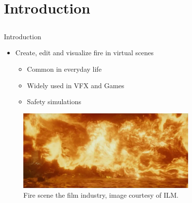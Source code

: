 \documentclass{beamer}
\begin{document}
\section{Introduction}
\subsection{ }

\begin{frame}{Introduction}

\begin{itemize}
\setlength\itemsep{0.5em}
\item Create, edit and visualize fire in virtual scenes
		\begin{itemize}
		\setlength\itemsep{0.5em}
		\item Common in everyday life
		\item Widely used in VFX and Games
		\item Safety simulations
		\end{itemize}
\end{itemize}

\begin{figure}[t!]
\begin{center}
\includegraphics[width=0.8\textwidth]{img/harry_potter_fire} 
\caption*{\tiny{Fire scene the film industry, image courtesy of ILM\footnotemark[1].}}
\end{center}
\end{figure}

\end{frame}
\end{document}
